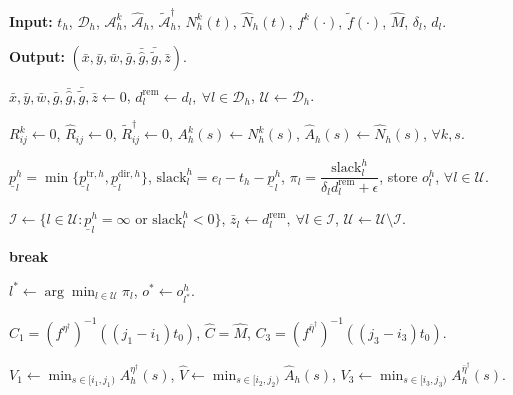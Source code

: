 \documentclass[10pt, reqno]{amsart}
\begin{document}
\begin{algorithm}[!htbp]
\caption{Dynamic BHH-aware priority construction heuristic}
\label{alg:dynamic_bhh_priority}
\begin{algorithmic}[1]

\Statex \textbf{Input:} $t_h$, $\mathcal D_h$, $\mathcal A_h^k$, $\widehat{\mathcal A}_h$,
$\widetilde{\mathcal A}_h^\dagger$, $N_h^k(t)$, $\widehat N_h(t)$,
$f^k(\cdot)$, $\widetilde f(\cdot)$, $\widehat M$, $\delta_l$, $d_l$.

\Statex \textbf{Output:}
$(\bar x,\bar y,\bar w,\bar g,\bar{\widehat g},\bar{\widetilde g},\bar z)$.

\State
$\bar x,\bar y,\bar w,\bar g,\bar{\widehat g},\bar{\widetilde g},\bar z\leftarrow 0$,
$d_l^{\mathrm{rem}}\leftarrow d_l,\ \forall l\in\mathcal D_h$,
$\mathcal U\leftarrow\mathcal D_h$.

\State
$R_{ij}^k\leftarrow 0$,
$\widehat R_{ij}\leftarrow 0$,
$\widetilde R_{ij}^{\dagger}\leftarrow 0$,
$A_h^k(s)\leftarrow N_h^k(s)$,
$\widehat A_h(s)\leftarrow \widehat N_h(s)$,
$\forall k,s$.


    \State
    $\underline p_l^h
    =
    \min\{\underline p_l^{\mathrm{tr},h},\underline p_l^{\mathrm{dir},h}\}$,
    $\mathrm{slack}_l^h=e_l-t_h-\underline p_l^h$,
    $\pi_l=
    \dfrac{\mathrm{slack}_l^h}{\delta_l d_l^{\mathrm{rem}}+\epsilon}$,
    store $o_l^h$,
    $\forall l\in\mathcal U$.

    \State
    $\mathcal I
    \leftarrow
    \{l\in\mathcal U:
    \underline p_l^h=\infty
    \text{ or }
    \mathrm{slack}_l^h<0\}$,
    $\bar z_l\leftarrow d_l^{\mathrm{rem}},\ \forall l\in\mathcal I$,
    $\mathcal U\leftarrow\mathcal U\setminus\mathcal I$.

     \textbf{break}
    \EndIf

    \State
    $l^*\leftarrow \arg\min_{l\in\mathcal U}\pi_l$,
    $o^*\leftarrow o_{l^*}^h$.


        \State
        $C_1=(f^{\eta^\dagger})^{-1}((j_1-i_1)t_0)$,
        $\widehat C=\widehat M$,
        $C_3=(f^{\bar\eta^\dagger})^{-1}((j_3-i_3)t_0)$.

        \State
        $V_1\leftarrow \min_{s\in[i_1,j_1)}A_h^{\eta^\dagger}(s)$,
        $\widehat V\leftarrow \min_{s\in[i_2,j_2)}\widehat A_h(s)$,
        $V_3\leftarrow \min_{s\in[i_3,j_3)}A_h^{\bar\eta^\dagger}(s)$.


\end{algorithmic}
\end{algorithm}
\end{document}
